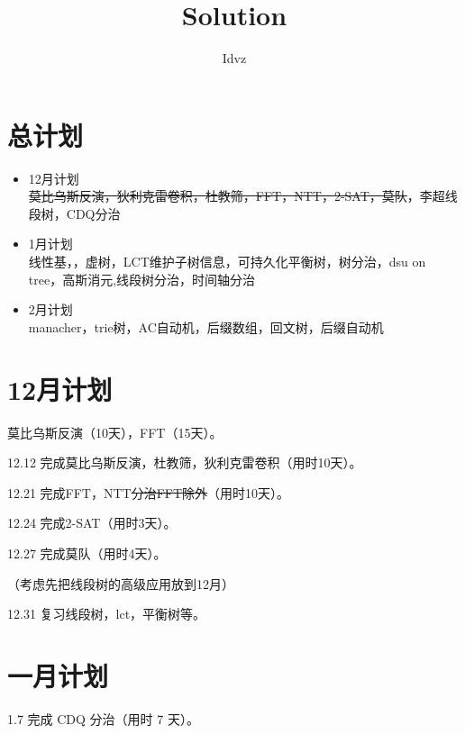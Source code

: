 \documentclass{ctexart}
\title{Solution}
\author{Idvz}
\begin{document}
\date{}
\maketitle





\section{总计划}
\begin{itemize}
\item 12月计划\\
  \sout{莫比乌斯反演，狄利克雷卷积，杜教筛，FFT，NTT，2-SAT，莫队}，李超线段树，CDQ分治
\item 1月计划\\
  线性基，，虚树，LCT维护子树信息，可持久化平衡树，树分治，dsu on tree，高斯消元,线段树分治，时间轴分治
\item 2月计划\\
  manacher，trie树，AC自动机，后缀数组，回文树，后缀自动机
\end{itemize}
  

\section{12月计划}

莫比乌斯反演（10天），FFT（15天）。

12.12 完成莫比乌斯反演，杜教筛，狄利克雷卷积（用时10天）。

12.21 完成FFT，NTT\sout{分治FFT除外}（用时10天）。

12.24 完成2-SAT（用时3天）。

12.27 完成莫队（用时4天）。

（考虑先把线段树的高级应用放到12月）

12.31 复习线段树，lct，平衡树等。

\section{一月计划}

1.7 完成 CDQ 分治（用时 7 天）。
\end{document}
